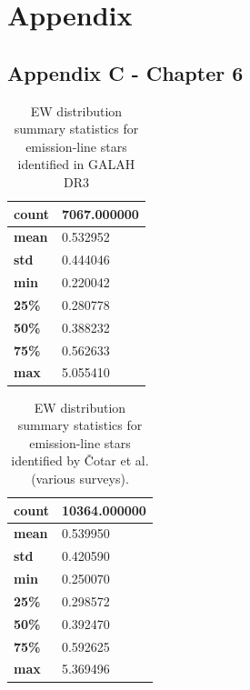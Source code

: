 \chapter{Appendix}

\section{Appendix C - Chapter 6}

\begin{table}[!htb]
\begin{center}
\begin{tabular}{|l|l|}
\hline
\textbf{count} & 7067.000000 \\ \hline
\textbf{mean} & 0.532952 \\ \hline
\textbf{std} & 0.444046 \\ \hline
\textbf{min} & 0.220042 \\ \hline
\textbf{25\%} & 0.280778 \\ \hline
\textbf{50\%} & 0.388232 \\ \hline
\textbf{75\%} & 0.562633 \\ \hline
\textbf{max} & 5.055410 \\ \hline
\end{tabular}
\caption{EW distribution summary statistics for emission-line stars identified in GALAH DR3}
\label{table:draglift1}
\end{center}
\end{table}

\begin{table}[!htb]
\begin{center}
\begin{tabular}{|l|l|}
\hline
\textbf{count} & 10364.000000 \\ \hline
\textbf{mean} & 0.539950 \\ \hline
\textbf{std} & 0.420590 \\ \hline
\textbf{min} & 0.250070 \\ \hline
\textbf{25\%} & 0.298572 \\ \hline
\textbf{50\%} & 0.392470 \\ \hline
\textbf{75\%} & 0.592625 \\ \hline
\textbf{max} & 5.369496 \\ \hline
\end{tabular}
\caption{EW distribution summary statistics for emission-line stars identified by Čotar et al. (various surveys).}
\label{table:draglift1}
\end{center}
\end{table}

